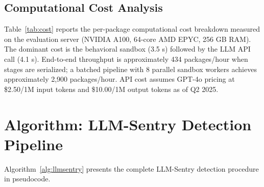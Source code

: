 \documentclass[conference]{IEEEtran}
\begin{document}
\subsection{Computational Cost Analysis}

Table~\ref{tab:cost} reports the per-package computational cost breakdown measured on the evaluation server (NVIDIA A100, 64-core AMD EPYC, 256 GB RAM). The dominant cost is the behavioral sandbox (3.5 s) followed by the LLM API call (4.1 s). End-to-end throughput is approximately 434 packages/hour when stages are serialized; a batched pipeline with 8 parallel sandbox workers achieves approximately 2,900 packages/hour. API cost assumes GPT-4o pricing at \$2.50/1M input tokens and \$10.00/1M output tokens as of Q2 2025.

\begin{table}[htbp]
\caption{Per-Package Computational Cost Breakdown}
\label{tab:cost}
\centering
\small
{}
\end{table}

\section{Algorithm: LLM-Sentry Detection Pipeline}
\label{sec:algorithm}

Algorithm~\ref{alg:llmsentry} presents the complete LLM-Sentry detection procedure in pseudocode.
\end{document}
